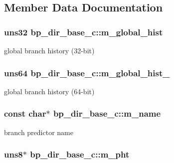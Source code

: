 \subsection{Member Data Documentation}
\hypertarget{classbp__dir__base__c_ac955abfb388ed1d48ebc5eccc916310c}{
\subsubsection[{m\_\-global\_\-hist}]{\setlength{\rightskip}{0pt plus 5cm}uns32 {\bf bp\_\-dir\_\-base\_\-c::m\_\-global\_\-hist}}}
\label{classbp__dir__base__c_ac955abfb388ed1d48ebc5eccc916310c}
global branch history (32-\/bit) \hypertarget{classbp__dir__base__c_a31b1491ed519c0f1b8387b5ac2d29a61}{
\subsubsection[{m\_\-global\_\-hist\_\-64}]{\setlength{\rightskip}{0pt plus 5cm}uns64 {\bf bp\_\-dir\_\-base\_\-c::m\_\-global\_\-hist\_}}}
\label{classbp__dir__base__c_a31b1491ed519c0f1b8387b5ac2d29a61}
global branch history (64-\/bit) \hypertarget{classbp__dir__base__c_a22d913a24f3144c33794b7440cf8d50c}{
\subsubsection[{m\_\-name}]{\setlength{\rightskip}{0pt plus 5cm}const char$\ast$ {\bf bp\_\-dir\_\-base\_\-c::m\_\-name}}}
\label{classbp__dir__base__c_a22d913a24f3144c33794b7440cf8d50c}
branch predictor name \hypertarget{classbp__dir__base__c_a8b2a7a886fa7bd761f9ed85dc3d3eb30}{
\subsubsection[{m\_\-pht}]{\setlength{\rightskip}{0pt plus 5cm}uns8$\ast$ {\bf bp\_\-dir\_\-base\_\-c::m\_\-pht}}}
